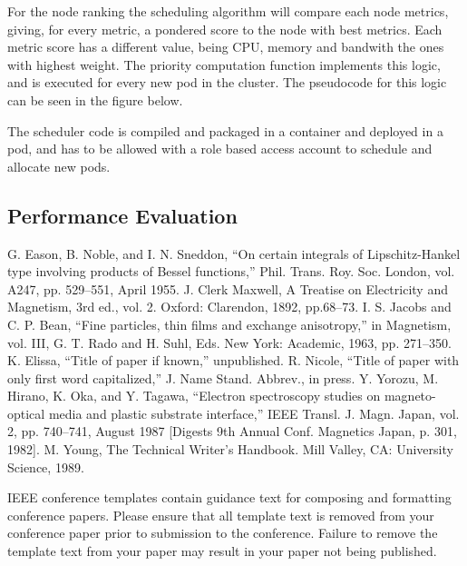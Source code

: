\documentclass[conference]{IEEEtran}
\begin{document}
For the node ranking the scheduling algorithm will compare each node metrics, giving, for every metric, a pondered score to the node
with best metrics. Each metric score has a different value, being CPU, memory and bandwith the ones with highest weight.
The priority computation function implements this logic, and is executed for every new pod in the cluster.
The pseudocode for this logic can be seen in the figure below.

The scheduler code is compiled and packaged in a container and deployed in a pod, and has to be allowed with a role based access account to schedule
and allocate new pods.

\subsection{Performance Evaluation}






\begin{thebibliography}{00}
 G. Eason, B. Noble, and I. N. Sneddon, ``On certain integrals of Lipschitz-Hankel type involving products of Bessel functions,'' Phil. Trans. Roy. Soc. London, vol. A247, pp. 529--551, April 1955.
 J. Clerk Maxwell, A Treatise on Electricity and Magnetism, 3rd ed., vol. 2. Oxford: Clarendon, 1892, pp.68--73.
 I. S. Jacobs and C. P. Bean, ``Fine particles, thin films and exchange anisotropy,'' in Magnetism, vol. III, G. T. Rado and H. Suhl, Eds. New York: Academic, 1963, pp. 271--350.
 K. Elissa, ``Title of paper if known,'' unpublished.
 R. Nicole, ``Title of paper with only first word capitalized,'' J. Name Stand. Abbrev., in press.
 Y. Yorozu, M. Hirano, K. Oka, and Y. Tagawa, ``Electron spectroscopy studies on magneto-optical media and plastic substrate interface,'' IEEE Transl. J. Magn. Japan, vol. 2, pp. 740--741, August 1987 [Digests 9th Annual Conf. Magnetics Japan, p. 301, 1982].
 M. Young, The Technical Writer's Handbook. Mill Valley, CA: University Science, 1989.
\end{thebibliography}
\vspace{12pt}
\color{red}
IEEE conference templates contain guidance text for composing and formatting conference papers. Please ensure that all template text is removed from your conference paper prior to submission to the conference. Failure to remove the template text from your paper may result in your paper not being published.
\end{document}
